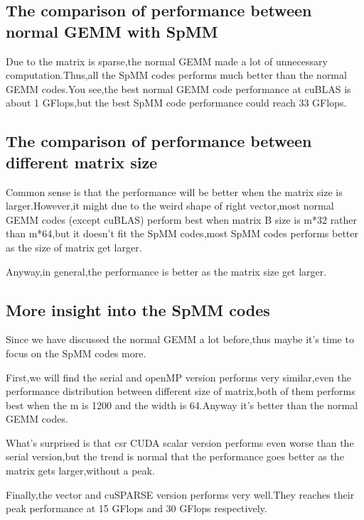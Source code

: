 \documentclass[11pt]{scrartcl} %
\begin{document}
\subsection{The comparison of performance between normal GEMM with SpMM}
Due to the matrix is sparse,the normal GEMM made a lot of unnecessary computation.Thus,all the SpMM codes performs much better than the normal GEMM codes.You see,the best normal GEMM code performance at cuBLAS is about 1 GFlops,but the best SpMM code performance could reach 33 GFlops.
\subsection{The comparison of performance between different matrix size}
Common sense is that the performance will be better when the matrix size is larger.However,it might due to the weird shape of right vector,most normal GEMM codes (except cuBLAS) perform best when matrix B size is m*32 rather than m*64,but it doesn't fit the SpMM codes,most SpMM codes performs better as the size of matrix get larger.

Anyway,in general,the performance is better as the matrix size get larger.
\subsection{More insight into the SpMM codes}
Since we have discussed the normal GEMM a lot before,thus maybe it's time to focus on the SpMM codes more.

First,we will find the serial and openMP version performs very similar,even the performance distribution between different size of matrix,both of them performs best when the m is 1200 and the width is 64.Anyway it's better than the normal GEMM codes.

What's surprised is that csr CUDA scalar version performs even worse than the serial version,but the trend is normal that the performance goes better as the matrix gets larger,without a peak.

Finally,the vector and cuSPARSE version performs very well.They reaches their peak performance at 15 GFlops and 30 GFlops respectively.
\end{document}

